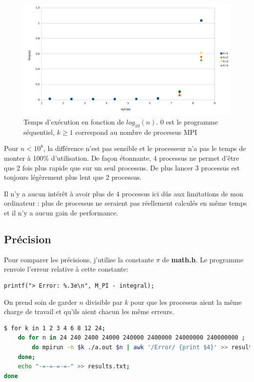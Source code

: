 \documentclass{article}
\begin{document}
\begin{figure}[h]
\centering
\includegraphics[width=\textwidth]{time}
\caption{Temps d'exécution en fonction de $log_{10}(n)$. 0 est le programme séquentiel, $k \geq 1$ correspond au nombre de processus MPI}
\end{figure}
Pour $n<10^8$, la différence n'est pas sensible et le processeur n'a pas le temps de monter à 100\% d'utilisation.
De façon étonnante, 4 processus ne permet d'être que 2 fois plus rapide que sur un seul processus. De plus lancer 3 processus est toujours légèrement plus lent que 2 processus.

Il n'y a aucun intérêt à avoir plus de 4 processus ici dûs aux limitations de mon ordinateur : plus de processus ne seraient pas réellement calculés en même temps et il n'y a aucun gain de performance.

\newpage
\subsection{Précision}

Pour comparer les précisions, j'utilise la constante $\pi$ de \textbf{math.h}.
Le programme renvoie l'erreur relative à cette constante:

\begin{lstlisting}[style=ccode, morekeywords={f}]
printf("> Error: %.3e\n", M_PI - integral);
\end{lstlisting}

On prend soin de garder $n$ divisible par $k$ pour que les processus aient la même charge de travail et qu'ils aient chacun les même erreurs.

\begin{lstlisting}[language=bash, keywordstyle=\color{black}\bf, keepspaces=true, texcl=true, columns=flexible]
$ for k in 1 2 3 4 6 8 12 24;
    do for n in 24 240 2400 24000 240000 2400000 24000000 240000000 ;
        do mpirun -n $k ./a.out $n | awk '/Error/ {print $4}' >> results.txt;
    done;
    echo "-=-=-=-=-" >> results.txt;
done
\end{lstlisting}
\end{document}
